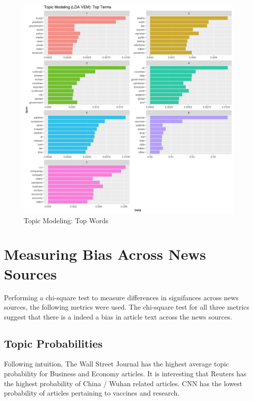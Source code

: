 \documentclass[
]{article}
\begin{document}
\begin{figure}
\centering
\includegraphics{../figures/lda_top_terms.png}
\caption{Topic Modeling: Top Words}
\end{figure}

\hypertarget{measuring-bias-across-news-sources}{%
\section{Measuring Bias Across News
Sources}\label{measuring-bias-across-news-sources}}

Performing a chi-square test to measure differences in signifances
across news sources, the following metrics were used. The chi-square
test for all three metrics suggest that there is a indeed a bias in
article text across the news sources.

\hypertarget{topic-probabilities}{%
\subsection{Topic Probabilities}\label{topic-probabilities}}

Following intuition, The Wall Street Journal has the highest average
topic probability for Business and Economy articles. It is interesting
that Reuters has the highest probability of China / Wuhan related
articles. CNN has the lowest probability of articles pertaining to
vaccines and research.
\end{document}

